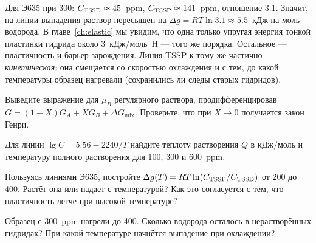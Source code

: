 \begin{zrbox}
Для Э635 при 300\degC: $C_{\mathrm{TSSD}} \approx 45$~ppm, $C_{\mathrm{TSSP}} \approx 141$~ppm, отношение 3.1. Значит, на линии
выпадения раствор пересыщен на $\Delta g = RT\ln 3.1 \approx 5.5$~кДж на моль водорода. В главе~\ref{ch:elastic} мы увидим, что
одна только упругая энергия тонкой пластинки гидрида около 3~кДж/моль~H --- того же порядка. Остальное
--- пластичность и барьер зарождения. Линия TSSP к тому же частично \emph{кинетическая}: она смещается со скоростью
охлаждения и с тем, до какой температуры образец нагревали (сохранились ли следы старых гидридов).
\end{zrbox}

\begin{exercise}
Выведите выражение для $\mu_B$ регулярного раствора, продифференцировав $G = (1-X)G_A + XG_B + \Delta G_{\text{mix}}$.
Проверьте, что при $X\to 0$ получается закон Генри.
\end{exercise}

\begin{exercise}
Для линии $\lg C = 5.56 - 2240/T$ найдите теплоту растворения $Q$ в кДж/моль и температуру полного растворения
для 100, 300 и 600~ppm.
\end{exercise}

\begin{exercise}
Пользуясь линиями Э635, постройте $\Delta g(T) = RT\ln(C_{\mathrm{TSSP}}/C_{\mathrm{TSSD}})$ от 200 до 400\degC. Растёт она или падает с
температурой? Как это согласуется с тем, что пластичность легче при высокой температуре?
\end{exercise}

\begin{exercise}
Образец с 300~ppm нагрели до 400\degC. Сколько водорода осталось в нерастворённых гидридах? При какой температуре
начнётся выпадение при охлаждении?
\end{exercise}
